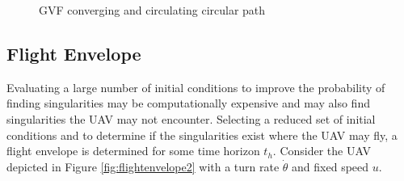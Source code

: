 \documentclass[conf]{new-aiaa}
\begin{document}
\begin{figure}[H]
	\begin{subfigmatrix}{2}%
		\centering	
		\hspace*{0mm}
	\end{subfigmatrix}
	\caption{GVF converging and circulating circular path}
	\label{fig:noCircSingularityDetection}
\end{figure}










\subsection{Flight Envelope}
Evaluating a large number of initial conditions to improve the probability of finding singularities may be computationally expensive and may also find singularities the UAV may not encounter. Selecting a reduced set of initial conditions and to determine if the singularities exist where the UAV may fly, a flight envelope is determined for some time horizon $t_h$. Consider the UAV depicted in Figure \ref{fig:flightenvelope2} with a turn rate $\dot{\theta}$ and fixed speed $u$. 
\end{document}
